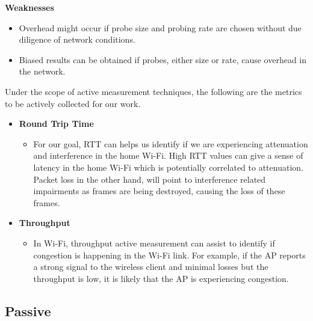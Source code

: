 \textbf{Weaknesses}
\begin{itemize}
	\item Overhead might occur if probe size and probing rate are chosen without due diligence of network conditions.
	\item Biased results can be obtained if probes, either size or rate, cause overhead in the network.
\end{itemize}


Under the scope of active measurement techniques, the following are the metrics to be actively collected for our work.

\begin{itemize}
	\item \textbf{Round Trip Time}
	\begin{itemize}
		\item For our goal, RTT can helps us identify if we are experiencing attenuation and interference in the home Wi-Fi. High RTT values can give a sense of latency in the home Wi-Fi which is potentially correlated to attenuation. Packet loss in the other hand, will point to interference related impairments as frames are being destroyed, causing the loss of these frames.
	\end{itemize}
	
	\item \textbf{Throughput}
	\begin{itemize}
		\item In Wi-Fi, throughput active measurement can assist to identify if congestion is happening in the Wi-Fi link. For example, if the AP reports a strong signal to the wireless client and minimal losses but the throughput is low, it is likely that the AP is experiencing congestion.
	\end{itemize}
\end{itemize}

\subsection{Passive}

